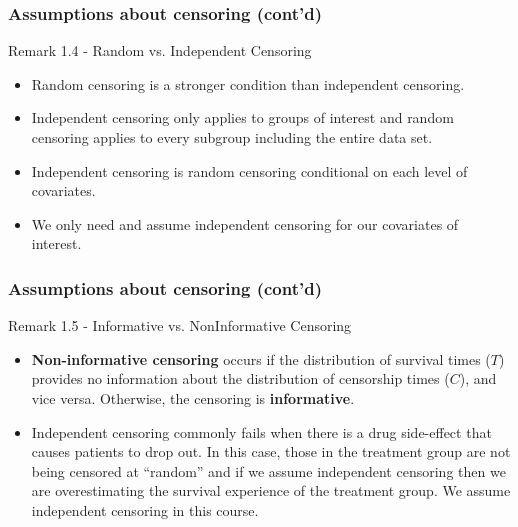 \documentclass{beamer}
\theoremstyle{definition}
\begin{document}
\begin{frame}
\frametitle{Assumptions about censoring (cont'd)}
\begin{block}{Remark 1.4 - Random vs. Independent Censoring}
\begin{itemize}
\item Random censoring is a stronger condition than independent censoring.
\item Independent censoring only applies to groups of interest and random censoring applies to every subgroup including the entire data set.
\item Independent censoring is random censoring conditional on each level of covariates.
\item We only need and assume independent censoring for our covariates of interest.
\end{itemize}
\end{block}
\end{frame}


\begin{frame}
\frametitle{Assumptions about censoring (cont'd)}
\begin{block}{Remark 1.5 - Informative vs. NonInformative Censoring}
\begin{itemize}
\item \textbf{Non-informative censoring} occurs if the distribution of survival times ($T$) provides no
information about the distribution of censorship times ($C$), and vice versa. Otherwise, the
censoring is \textbf{informative}.
\item Independent censoring commonly fails when there is a drug side-effect that causes patients to drop out. In this case, those in the treatment group are not being censored at ``random'' and if we assume independent censoring then we are overestimating the survival experience of the treatment group. We assume independent censoring in this course.
\end{itemize}
\end{block}
\end{frame}
\end{document}

